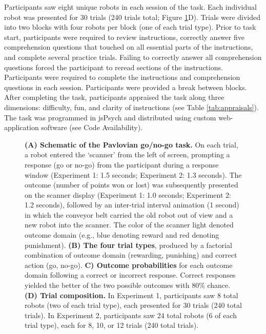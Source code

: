 \documentclass[a4paper,12pt]{article}
\begin{document}
\begin{refsection}[main]
Participants saw eight unique robots in each session of the task. Each individual robot was presented for 30 trials (240 trials total; Figure \ref{fig:task_schematic}D). Trials were divided into two blocks with four robots per block (one of each trial type). Prior to task start, participants were required to review instructions, correctly answer five comprehension questions that touched on all essential parts of the instructions, and complete several practice trials. Failing to correctly answer all comprehension questions forced the participant to reread sections of the instructions. Participants were required to complete the instructions and comprehension questions in each session. Participants were provided a break between blocks. After completing the task, participants appraised the task along three dimensions: difficulty, fun, and clarity of instructions (see Table \ref{tab:appraisals}). The task was programmed in jsPsych \cite{de2015jspsych} and distributed using custom web-application software (see Code Availability). 

\begin{figure}[t]
    \centerline{}
    \caption{{\bf (A) Schematic of the Pavlovian go/no-go task.} On each trial, a robot entered the `scanner' from the left of screen, prompting a response (go or no-go) from the participant during a response window (Experiment 1: 1.5 seconds; Experiment 2: 1.3 seconds). The outcome (number of points won or lost) was subsequently presented on the scanner display (Experiment 1: 1.0 seconds; Experiment 2: 1.2 seconds), followed by an inter-trial interval animation (1 second) in which the conveyor belt carried the old robot out of view and a new robot into the scanner. The color of the scanner light denoted outcome domain (e.g., blue denoting reward and red denoting punishment). {\bf (B) The four trial types}, produced by a factorial combination of outcome domain (rewarding, punishing) and correct action (go, no-go). {\bf C) Outcome probabilities} for each outcome domain following a correct or incorrect response. Correct responses yielded the better of the two possible outcomes with 80\% chance. {\bf (D) Trial composition.} In Experiment 1, participants saw 8 total robots (two of each trial type), each presented for 30 trials (240 total trials). In Experiment 2, participants saw 24 total robots (6 of each trial type), each for 8, 10, or 12 trials (240 total trials).}
    \label{fig:task_schematic}
\end{figure}


\end{refsection}
\end{document}
